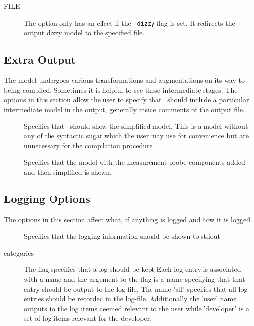 \begin{description}
\item[ FILE]
The  option only has an effect if the
\texttt{--dizzy} flag is set. It redirects the output
dizzy model to the specified file.

\end{description}


\subsection{Extra Output}
The model undergoes various transformations and
augmentations on its way to being compiled.
Sometimes it is helpful to see these intermediate
stages. The options in this section allow the user
to specify that \commandNameIpcSmc\ should
include a particular intermediate model in the output,
generally inside comments of the output file.

\begin{description}
\item[ ]
Specifies that \commandNameIpcSmc\ should show the
simplified model. This is a model without any of the
syntactic sugar which the user may use for convenience
but are unnecessary for the compilation procedure

\end{description}

\begin{description}
\item[ ]
Specifies that the model with the measurement probe
components added and then simplified is shown.

\end{description}


\subsection{Logging Options}
The options in this section affect what, if anything
is logged and how it is logged

\begin{description}
\item[ ]
Specifies that the logging information should be shown to stdout

\end{description}

\begin{description}
\item[ categories]
The flag  specifies that a log should be kept
Each log entry is associated with a name and the argument
to the  flag is a name specifying that that
entry should be output to the log file.
The name 'all' specifies that all log entries
should be recorded in the log-file.
Additionally the 'user' name outputs to the log items
deemed relevant to the user while 'developer' is a set
of log items relevant for the developer.

\end{description}


